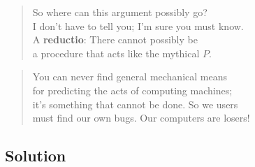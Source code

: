 \documentclass{article}
\begin{document}
\begin{verse}
So where can this argument possibly go?\\
I don't have to tell you; I'm sure you must know.\\
A \textbf{reductio}: There cannot possibly be\\
a procedure that acts like the mythical \(P\).
\end{verse}
\begin{verse}
You can never find general mechanical means\\
for predicting the acts of computing machines;\\
it's something that cannot be done. So we users\\
must find our own bugs. Our computers are losers!
\end{verse}

\subsection{Solution}
\end{document}
